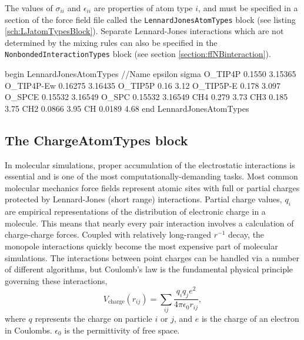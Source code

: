 \documentclass[]{book}
\begin{document}
The values of $\sigma_{ii}$ and $\epsilon_{ii}$ are properties of atom
type $i$, and must be specified in a section of the force field file
called the {\tt LennardJonesAtomTypes} block (see listing
\ref{sch:LJatomTypesBlock}).  Separate Lennard-Jones interactions
which are not determined by the mixing rules can also be specified in
the {\tt NonbondedInteractionTypes} block (see section
\ref{section:ffNBinteraction}).

\begin{code}[caption={[An example of a LennardJonesAtomTypes block.] A
simple example of a LennardJonesAtomTypee block.   Units for
$\epsilon$ are kcal / mol and for $\sigma$ are \AA\ .},
label={sch:LJatomTypesBlock}]
begin LennardJonesAtomTypes
//Name          epsilon             sigma       
O_TIP4P         0.1550          3.15365 
O_TIP4P-Ew      0.16275         3.16435
O_TIP5P         0.16            3.12   
O_TIP5P-E       0.178           3.097   
O_SPCE          0.15532         3.16549
O_SPC           0.15532         3.16549
CH4             0.279           3.73
CH3             0.185           3.75
CH2             0.0866          3.95
CH              0.0189          4.68
end LennardJonesAtomTypes
\end{code}

\subsection{\label{section:ffCharge}The ChargeAtomTypes block}

In molecular simulations, proper accumulation of the electrostatic
interactions is essential and is one of the most
computationally-demanding tasks.  Most common molecular mechanics
force fields represent atomic sites with full or partial charges
protected by Lennard-Jones (short range) interactions.  Partial charge
values, $q_i$ are empirical representations of the distribution of
electronic charge in a molecule.  This means that nearly every pair
interaction involves a calculation of charge-charge forces.  Coupled
with relatively long-ranged $r^{-1}$ decay, the monopole interactions
quickly become the most expensive part of molecular simulations.  The
interactions between point charges can be handled via a number of
different algorithms, but Coulomb's law is the fundamental physical
principle governing these interactions,
\begin{equation}
  V_{\text{charge}}(r_{ij}) = \sum_{ij}\frac{q_iq_je^2}{4 \pi \epsilon_0
    r_{ij}}, 
\end{equation}
where $q$ represents the charge on particle $i$ or $j$, and $e$ is the
charge of an electron in Coulombs.  $\epsilon_0$ is the permittivity
of free space.
\end{document}
